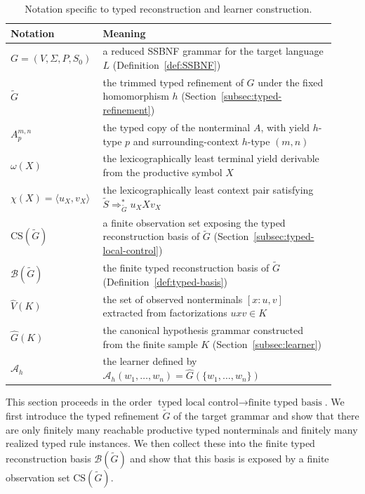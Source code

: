 \documentclass[11pt,a4paper]{article}
\newcommand{\CS}{\mathrm{CS}}
\begin{document}
\begin{table}[h]
\centering
\small
\begin{tabular}{>{\raggedright\arraybackslash}p{0.22\linewidth} >{\raggedright\arraybackslash}p{0.70\linewidth}}
\toprule
Notation & Meaning \\
\midrule
$G=(V,\Sigma,P,S_0)$ & a reduced SSBNF grammar for the target language $L$ (Definition~\ref{def:SSBNF}) \\
$\widetilde G$ & the trimmed typed refinement of $G$ under the fixed homomorphism $h$ (Section~\ref{subsec:typed-refinement}) \\
$A_p^{m,n}$ & the typed copy of the nonterminal $A$, with yield $h$-type $p$ and surrounding-context $h$-type $(m,n)$ \\
$\omega(X)$ & the lexicographically least terminal yield derivable from the productive symbol $X$ \\
$\chi(X)=\langle u_X,v_X\rangle$ & the lexicographically least context pair satisfying $\widetilde S\Rightarrow_{\widetilde G}^* u_X X v_X$ \\
$\CS(\widetilde G)$ & a finite observation set exposing the typed reconstruction basis of $\widetilde G$ (Section~\ref{subsec:typed-local-control}) \\
$\mathcal B(\widetilde G)$ & the finite typed reconstruction basis of $\widetilde G$ (Definition~\ref{def:typed-basis}) \\
$\hat V(K)$ & the set of observed nonterminals $[x:u,v]$ extracted from factorizations $uxv\in K$ \\
$\hat G(K)$ & the canonical hypothesis grammar constructed from the finite sample $K$ (Section~\ref{subsec:learner}) \\
$\mathcal A_h$ & the learner defined by $\mathcal A_h(w_1,\dots,w_n)=\hat G(\{w_1,\dots,w_n\})$ \\
\bottomrule
\end{tabular}
\caption{Notation specific to typed reconstruction and learner construction.}
\label{tab:notation-typed}
\end{table}

This section proceeds in the order
$\text{typed local control}\to\text{finite typed basis}$. We first
introduce the typed refinement $\widetilde G$ of the target grammar and
show that there are only finitely many reachable productive typed
nonterminals and finitely many realized typed rule instances. We then
collect these into the finite typed reconstruction basis
$\mathcal B(\widetilde G)$ and show that this basis is exposed by a
finite observation set $\CS(\widetilde G)$.
\end{document}
